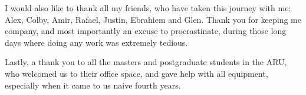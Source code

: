 I would also like to thank all my friends, who have taken this journey with me: Alex, Colby, Amir, Rafael, Justin, Ebrahiem and Glen. Thank you for keeping me company, and most importantly an excuse to procrastinate, during those long days where doing any work was extremely tedious.

Lastly, a thank you to all the masters and postgraduate students in the ARU, who welcomed us to their office space, and gave help with all equipment, especially when it came to us naive fourth years.
